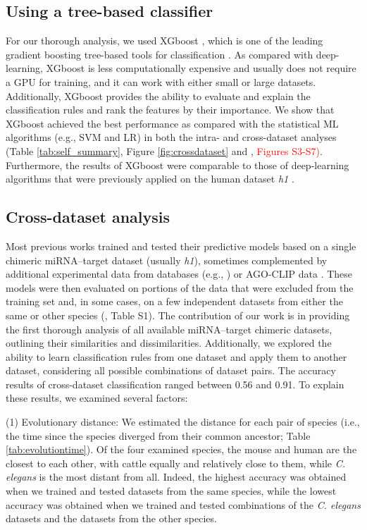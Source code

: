 \documentclass{bmcart}
\begin{document}
\subsection*{Using a tree-based classifier} 
For our thorough analysis, we used XGboost \cite{xgboost}, which is one of the leading gradient boosting tree-based tools for classification \cite{nielsen2016tree}. As compared with deep-learning, XGboost is less computationally expensive and usually does not require a GPU for training, and it can work with either small or large datasets. Additionally, XGboost provides the ability to evaluate and explain the classification rules and rank the features by their importance. 
We show that XGboost achieved the best performance as compared with the statistical ML algorithms (e.g., SVM and LR) in both the intra- and cross-dataset analyses (Table \ref{tab:self_summary}, Figure \ref{fig:crossdataset} and , \textcolor{red}{Figures S3-S7)}. Furthermore, the results of XGboost were comparable to those of deep-learning algorithms that were previously applied on the human dataset \textit{h1} \cite{wen2018deepmirtar, lee2016deeptarget}.

\subsection*{Cross-dataset analysis}
Most previous works trained and tested their predictive models based on a single chimeric miRNA--target dataset (usually \textit{h1}), sometimes complemented by additional experimental data from databases (e.g., \cite{xiao2009mirecords,chou2016mirtarbase}) or AGO-CLIP data \cite{ding2016tarpmir,wen2018deepmirtar,paker2019mirlstm, lu2016learning, pla2018miraw}. These models were then evaluated on portions of the data that were excluded from the training set and, in some cases, on a few independent datasets from either the same or other species  (, Table S1). 
The contribution of our work is in providing the first thorough analysis of all available miRNA--target chimeric datasets, outlining their similarities and dissimilarities. Additionally, we explored the ability to learn classification rules from one dataset and apply them to another dataset, considering all possible combinations of dataset pairs.
The accuracy results of cross-dataset classification ranged between 0.56 and 0.91. To explain these results, we examined several factors:

(1) Evolutionary distance: We estimated the distance for each pair of species (i.e., the time since the species diverged from their common ancestor; Table \ref{tab:evolutiontime}). Of the four examined species, the mouse and human are the closest to each other, with cattle equally and relatively close to them, while \textit{C. elegans} is the most distant from all. Indeed, the highest accuracy was obtained when we trained and tested datasets from the same species, while the lowest accuracy was obtained when we trained and tested combinations of the \textit{C. elegans} datasets and the datasets from the other species.
\end{document}
